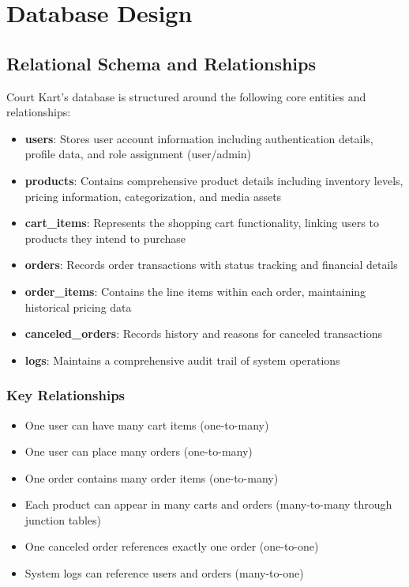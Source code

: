 \documentclass[13pt,a4paper]{article}
\begin{document}
\section{Database Design}

\subsection{Relational Schema and Relationships}

Court Kart's database is structured around the following core entities and relationships:

\begin{itemize}
	\item \textbf{users}: Stores user account information including authentication details, profile data, and role assignment (user/admin)
	\item \textbf{products}: Contains comprehensive product details including inventory levels, pricing information, categorization, and media assets
	\item \textbf{cart\_items}: Represents the shopping cart functionality, linking users to products they intend to purchase
	\item \textbf{orders}: Records order transactions with status tracking and financial details
	\item \textbf{order\_items}: Contains the line items within each order, maintaining historical pricing data
	\item \textbf{canceled\_orders}: Records history and reasons for canceled transactions
	\item \textbf{logs}: Maintains a comprehensive audit trail of system operations
\end{itemize}

\subsubsection{Key Relationships}

\begin{itemize}
	\item One user can have many cart items (one-to-many)
	\item One user can place many orders (one-to-many)
	\item One order contains many order items (one-to-many)
	\item Each product can appear in many carts and orders (many-to-many through junction tables)
	\item One canceled order references exactly one order (one-to-one)
	\item System logs can reference users and orders (many-to-one)
\end{itemize}
\end{document}
